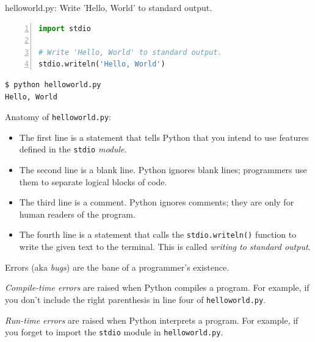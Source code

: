 \documentclass[8pt,a4paper,compress,handout]{beamer}
\begin{document}
\begin{frame}[fragile]
\begin{framed}
\tiny helloworld.py: Write 'Hello, World' to standard output.
\end{framed}

\begin{lstlisting}[language=Python,numbers=left]
import stdio

# Write 'Hello, World' to standard output.
stdio.writeln('Hello, World')
\end{lstlisting}

\begin{lstlisting}[language={}]
$ python helloworld.py 
Hello, World
\end{lstlisting}

\bigskip

Anatomy of \lstinline{helloworld.py}:
\begin{itemize}
\item The first line is a statement that tells Python that you intend to use features defined in the \lstinline{stdio} \emph{module}.
 
\item The second line is a blank line. Python ignores blank lines; programmers use them to separate logical blocks of code.

\item The third line is a comment. Python ignores comments; they are only for human readers of the program.

\item The fourth line is a statement that calls the \lstinline{stdio.writeln()} function to write the given text to the terminal. This is called \emph{writing to standard output}.
\end{itemize}
\end{frame}

\begin{frame}[fragile]
Errors (aka \emph{bugs}) are the bane of a programmer's existence. 

\bigskip

\emph{Compile-time errors} are raised when Python compiles a program. For example, if you don't include the right parenthesis in line four of \lstinline{helloworld.py}.

\bigskip

\emph{Run-time errors} are raised when Python interprets a program. For example, if you forget to import the \lstinline{stdio} module in \lstinline{helloworld.py}.
\end{frame}
\end{document}
